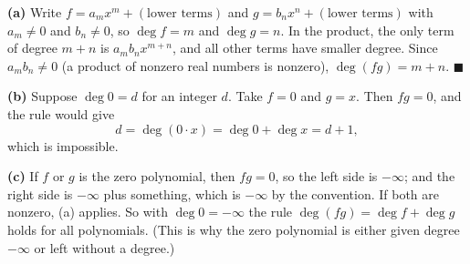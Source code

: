 \textbf{(a)} Write $f=a_mx^m+(\text{lower terms})$ and $g=b_nx^n+(\text{lower terms})$ with $a_m\ne0$ and $b_n\ne0$, so $\deg f=m$ and $\deg g=n$. In the product, the only term of degree $m+n$ is $a_mb_nx^{m+n}$, and all other terms have smaller degree. Since $a_mb_n\ne0$ (a product of nonzero real numbers is nonzero), $\deg(fg)=m+n$. $\blacksquare$

\textbf{(b)} Suppose $\deg0=d$ for an integer $d$. Take $f=0$ and $g=x$. Then $fg=0$, and the rule would give
\[d=\deg(0\cdot x)=\deg0+\deg x=d+1,\]
which is impossible.

\textbf{(c)} If $f$ or $g$ is the zero polynomial, then $fg=0$, so the left side is $-\infty$; and the right side is $-\infty$ plus something, which is $-\infty$ by the convention. If both are nonzero, (a) applies. So with $\deg0=-\infty$ the rule $\deg(fg)=\deg f+\deg g$ holds for all polynomials. (This is why the zero polynomial is either given degree $-\infty$ or left without a degree.)
